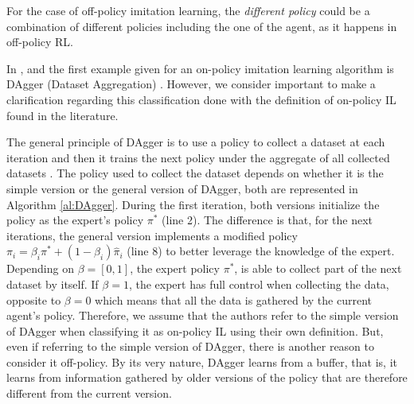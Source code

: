 For the case of off-policy imitation learning, the \textit{different policy} could be a combination of different policies including the one of the agent, as it happens in off-policy RL.


In \cite{DBLP:journals/corr/LaskeyLHLMFG17}, \cite{OtherLaskeydefinitions:2019} and \cite{Osa:2018} the first example given for an on-policy imitation learning algorithm is DAgger (Dataset  Aggregation) \cite{DAgger-Ross:2011}. However, we consider important to make a clarification regarding this classification done with the definition of on-policy IL found in the literature. 

The general principle of DAgger is to use a policy to collect a dataset at each iteration and then it trains the next policy under the aggregate of all collected datasets \cite{DAgger-Ross:2011}. The policy used to collect the dataset depends on whether it is the simple version or the general version of DAgger, both are represented in Algorithm \ref{al:DAgger}. During the first iteration, both versions initialize the policy as the expert’s policy $\pi^*$ (line 2). The difference is that, for the next iterations, the general version implements a modified policy $\pi_i=\beta_i\pi^*+ (1−\beta_i)\hat{\pi}_i$ (line 8) to better leverage the knowledge of the expert. Depending on $\beta = [0,1]$, the expert policy $\pi^*$, is able to collect part of the next dataset by itself. If $\beta = 1$, the expert has full control when collecting the data, opposite to $\beta=0$  which means that all the data is gathered by the current agent's policy.
Therefore, we assume that the authors refer to the simple version of DAgger when classifying it as on-policy IL using their own definition. But, even if referring to the simple version of DAgger, there is another reason to consider it off-policy. By its very nature, DAgger learns from a buffer, that is, it learns from information gathered by older versions of the policy that are therefore different from the current version.




